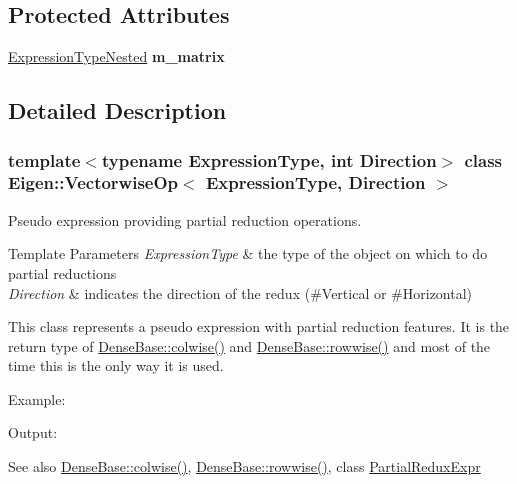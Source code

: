 \subsection*{Protected Attributes}
\begin{DoxyCompactItemize}
\item 
\mbox{\label{class_eigen_1_1_vectorwise_op_a335b750b0ff7454428c49d375d448bb3}} 
\mbox{\hyperlink{struct_eigen_1_1internal_1_1true__type}{Expression\+Type\+Nested}} {\bfseries m\+\_\+matrix}
\end{DoxyCompactItemize}


\subsection{Detailed Description}
\subsubsection*{template$<$typename Expression\+Type, int Direction$>$\newline
class Eigen\+::\+Vectorwise\+Op$<$ Expression\+Type, Direction $>$}

Pseudo expression providing partial reduction operations. 


\begin{DoxyTemplParams}{Template Parameters}
{\em Expression\+Type} & the type of the object on which to do partial reductions \\
\hline
{\em Direction} & indicates the direction of the redux (\#\+Vertical or \#\+Horizontal)\\
\hline
\end{DoxyTemplParams}
This class represents a pseudo expression with partial reduction features. It is the return type of \mbox{\hyperlink{class_eigen_1_1_dense_base_a1c0e1b6067ec1de6cb8799da55aa7d30}{Dense\+Base\+::colwise()}} and \mbox{\hyperlink{class_eigen_1_1_dense_base_a6daa3a3156ca0e0722bf78638e1c7f28}{Dense\+Base\+::rowwise()}} and most of the time this is the only way it is used.

Example\+: 
\begin{DoxyCodeInclude}{0}
\end{DoxyCodeInclude}
 Output\+: 
\begin{DoxyVerbInclude}
\end{DoxyVerbInclude}


\begin{DoxySeeAlso}{See also}
\mbox{\hyperlink{class_eigen_1_1_dense_base_a1c0e1b6067ec1de6cb8799da55aa7d30}{Dense\+Base\+::colwise()}}, \mbox{\hyperlink{class_eigen_1_1_dense_base_a6daa3a3156ca0e0722bf78638e1c7f28}{Dense\+Base\+::rowwise()}}, class \mbox{\hyperlink{class_eigen_1_1_partial_redux_expr}{Partial\+Redux\+Expr}} 
\end{DoxySeeAlso}


